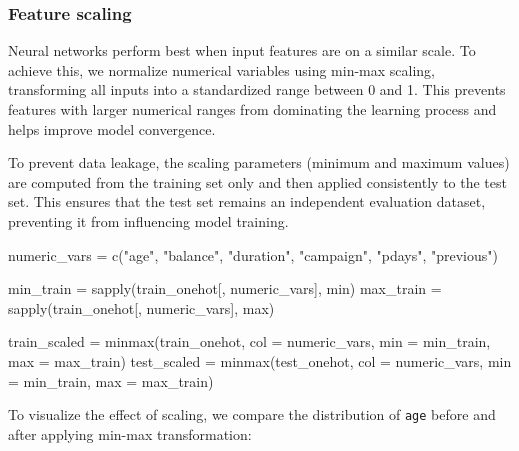 \documentclass[
  11pt,
]{book}
\makeatletter
\newenvironment{Shaded}{}{}
\newcommand{\AttributeTok}[1]{#1}
\newcommand{\FunctionTok}[1]{#1}
\newcommand{\NormalTok}[1]{#1}
\newcommand{\OtherTok}[1]{\textcolor[rgb]{0.39,0.39,0.39}{#1}}
\newcommand{\StringTok}[1]{\textcolor[rgb]{0.39,0.39,0.39}{#1}}
\newenvironment{kframe}{%
\medskip{}
\setlength{\fboxsep}{.8em}
 \def\at@end@of@kframe{}%
 \ifinner\ifhmode%
  \def\at@end@of@kframe{\end{minipage}}%
  \begin{minipage}{\columnwidth}%
 \fi\fi%
 \def\FrameCommand##1{\hskip\@totalleftmargin \hskip-\fboxsep
 \colorbox{shadecolor}{##1}\hskip-\fboxsep
     \hskip-\linewidth \hskip-\@totalleftmargin \hskip\columnwidth}%
 \MakeFramed {\advance\hsize-\width
   \@totalleftmargin\z@ \linewidth\hsize
   \@setminipage}}%
 {\par\unskip\endMakeFramed%
 \at@end@of@kframe}
\renewenvironment{Shaded}{\begin{kframe}}{\end{kframe}}
\theoremstyle{definition}
\theoremstyle{definition}
\theoremstyle{definition}
\theoremstyle{definition}
\theoremstyle{remark}
\makeatother
\begin{document}
\subsubsection*{Feature scaling}\label{feature-scaling-3}


Neural networks perform best when input features are on a similar scale. To achieve this, we normalize numerical variables using min-max scaling, transforming all inputs into a standardized range between 0 and 1. This prevents features with larger numerical ranges from dominating the learning process and helps improve model convergence.

To prevent data leakage, the scaling parameters (minimum and maximum values) are computed from the training set only and then applied consistently to the test set. This ensures that the test set remains an independent evaluation dataset, preventing it from influencing model training.

\begin{Shaded}
\begin{Highlighting}[]
\NormalTok{numeric\_vars }\OtherTok{=} \FunctionTok{c}\NormalTok{(}\StringTok{"age"}\NormalTok{, }\StringTok{"balance"}\NormalTok{, }\StringTok{"duration"}\NormalTok{, }\StringTok{"campaign"}\NormalTok{, }\StringTok{"pdays"}\NormalTok{, }\StringTok{"previous"}\NormalTok{)}

\NormalTok{min\_train }\OtherTok{=} \FunctionTok{sapply}\NormalTok{(train\_onehot[, numeric\_vars], min)}
\NormalTok{max\_train }\OtherTok{=} \FunctionTok{sapply}\NormalTok{(train\_onehot[, numeric\_vars], max)}

\NormalTok{train\_scaled }\OtherTok{=} \FunctionTok{minmax}\NormalTok{(train\_onehot, }\AttributeTok{col =}\NormalTok{ numeric\_vars, }\AttributeTok{min =}\NormalTok{ min\_train, }\AttributeTok{max =}\NormalTok{ max\_train)}
\NormalTok{test\_scaled  }\OtherTok{=} \FunctionTok{minmax}\NormalTok{(test\_onehot,  }\AttributeTok{col =}\NormalTok{ numeric\_vars, }\AttributeTok{min =}\NormalTok{ min\_train, }\AttributeTok{max =}\NormalTok{ max\_train)}
\end{Highlighting}
\end{Shaded}

To visualize the effect of scaling, we compare the distribution of \texttt{age} before and after applying min-max transformation:
\end{document}
